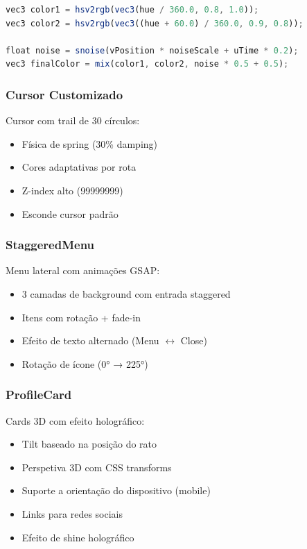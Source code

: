 \documentclass[12pt,a4paper]{article}
\begin{document}
\begin{lstlisting}[language=JavaScript, caption={Shader GLSL do Orb (fragmento)}]
vec3 color1 = hsv2rgb(vec3(hue / 360.0, 0.8, 1.0));
vec3 color2 = hsv2rgb(vec3((hue + 60.0) / 360.0, 0.9, 0.8));

float noise = snoise(vPosition * noiseScale + uTime * 0.2);
vec3 finalColor = mix(color1, color2, noise * 0.5 + 0.5);
\end{lstlisting}

\subsubsection{Cursor Customizado}
Cursor com trail de 30 círculos:
\begin{itemize}
    \item Física de spring (30\% damping)
    \item Cores adaptativas por rota
    \item Z-index alto (99999999)
    \item Esconde cursor padrão
\end{itemize}

\subsubsection{StaggeredMenu}
Menu lateral com animações GSAP:
\begin{itemize}
    \item 3 camadas de background com entrada staggered
    \item Itens com rotação + fade-in
    \item Efeito de texto alternado (Menu $\leftrightarrow$ Close)
    \item Rotação de ícone (0° → 225°)
\end{itemize}

\subsubsection{ProfileCard}
Cards 3D com efeito holográfico:
\begin{itemize}
    \item Tilt baseado na posição do rato
    \item Perspetiva 3D com CSS transforms
    \item Suporte a orientação do dispositivo (mobile)
    \item Links para redes sociais
    \item Efeito de shine holográfico
\end{itemize}
\end{document}
